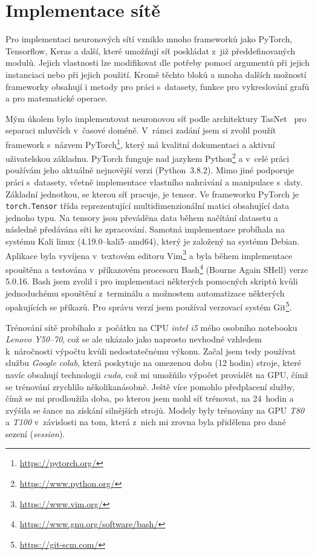\chapter{Implementace sítě}
\label{implementace}
Pro implementaci neuronových sítí vzniklo mnoho frameworků jako PyTorch, Tensorflow, Keras a další, které umožňují síť poskládat z~již předdefinovaných modulů. Jejich vlastnosti lze modifikovat dle potřeby pomocí argumentů při jejich instanciaci nebo při jejich použití. Kromě těchto bloků a mnoha dalších možností frameworky obsahují i metody pro práci s~datasety, funkce pro vykreslování grafů a pro matematické operace.

Mým úkolem bylo implementovat neuronovou síť podle architektury TasNet~\cite{luo2018convtasnet} pro separaci mluvčích v~časové doméně. V~rámci zadání jsem si zvolil použít framework s~názvem PyTorch\footnote{\url{https://pytorch.org/}}, který má kvalitní dokumentaci a aktivní uživatelskou základnu. PyTorch funguje nad jazykem Python\footnote{\url{https://www.python.org/}} a v~celé práci používám jeho aktuálně nejnovější verzi (Python~3.8.2). Mimo jiné podporuje práci s~datasety, včetně implementace vlastního nahrávání a manipulace s~daty. Základní jednotkou, se kterou síť pracuje, je tensor. Ve frameworku PyTorch je \texttt{torch.Tensor} třída reprezentující multidimenzionální matici obsahující data jednoho typu. Na tensory jsou převáděna data během načítání datasetu a následně předávána síti ke zpracování. Samotná implementace probíhala na systému Kali linux (4.19.0--kali5--amd64), který je založený na systému Debian. Aplikace byla vyvíjena v~textovém editoru Vim\footnote{\url{https://www.vim.org/}} a byla během implementace spouštěna a testována v~příkazovém procesoru Bash\footnote{\url{https://www.gnu.org/software/bash/}} (Bourne Again SHell) verze 5.0.16. Bash jsem zvolil i pro implementaci některých pomocných skriptů kvůli jednoduchému spouštění z~terminálu a možnostem automatizace některých opakujících se příkazů. Pro správu verzí jsem používal verzovací systém Git\footnote{\url{https://git-scm.com/}}.

Trénování sítě probíhalo z~počátku na CPU \textit{intel i5} mého osobního notebooku \textit{Lenovo Y50--70}, což se ale ukázalo jako naprosto nevhodné vzhledem k~náročnosti výpočtu kvůli nedostatečnému výkonu. Začal jsem tedy používat službu \textit{Google colab}, která poskytuje na omezenou dobu (12 hodin) stroje, které navíc obsahují technologii \textit{cuda}, což mi umožňilo výpočet provádět na GPU, čímž se trénování zrychlilo několikanásobně. Ještě více pomohlo předplacení služby, čímž se mi prodloužila doba, po kterou jsem mohl síť trénovat, na 24~hodin a zvýšila se šance na získání silnějších strojů. Modely byly trénovány na GPU \textit{T80} a \textit{T100} v~závislosti na tom, která z~nich mi zrovna byla přidělena pro dané sezení (\textit{session}). 

